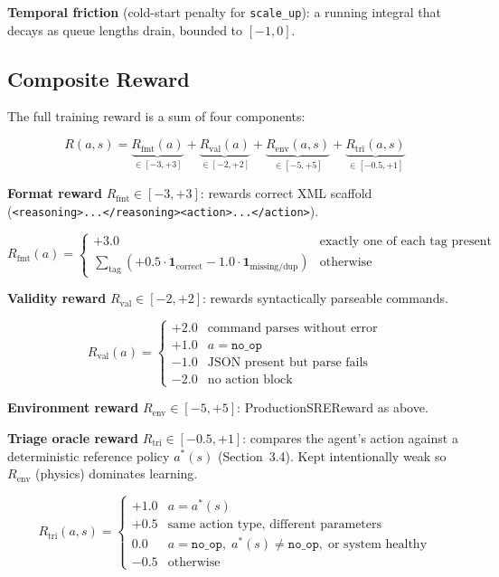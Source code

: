 \documentclass{article}
\begin{document}
\textbf{Temporal friction} (cold-start penalty for \texttt{scale\_up}): a running
integral that decays as queue lengths drain, bounded to $[-1, 0]$.

\subsection{Composite Reward}

The full training reward is a sum of four components:

\[
R(a, s) = \underbrace{R_{\mathrm{fmt}}(a)}_{\in[-3,+3]} + \underbrace{R_{\mathrm{val}}(a)}_{\in[-2,+2]} + \underbrace{R_{\mathrm{env}}(a, s)}_{\in[-5,+5]} + \underbrace{R_{\mathrm{tri}}(a, s)}_{\in[-0.5,+1]}
\]

\textbf{Format reward} $R_{\mathrm{fmt}} \in [-3, +3]$: rewards correct XML scaffold
(\texttt{<reasoning>...</reasoning><action>...</action>}).

\[
R_{\mathrm{fmt}}(a) = \begin{cases}
+3.0 & \text{exactly one of each tag present} \\
\sum_{\text{tag}} (+0.5 \cdot \mathbf{1}_{\text{correct}} - 1.0 \cdot \mathbf{1}_{\text{missing/dup}}) & \text{otherwise}
\end{cases}
\]

\textbf{Validity reward} $R_{\mathrm{val}} \in [-2, +2]$: rewards syntactically
parseable commands.

\[
R_{\mathrm{val}}(a) = \begin{cases}
+2.0 & \text{command parses without error} \\
+1.0 & a = \texttt{no\_op} \\
-1.0 & \text{JSON present but parse fails} \\
-2.0 & \text{no action block}
\end{cases}
\]

\textbf{Environment reward} $R_{\mathrm{env}} \in [-5, +5]$: ProductionSREReward as above.

\textbf{Triage oracle reward} $R_{\mathrm{tri}} \in [-0.5, +1]$: compares the agent's
action against a deterministic reference policy $a^*(s)$ (Section~3.4). Kept
intentionally weak so $R_{\mathrm{env}}$ (physics) dominates learning.

\[
R_{\mathrm{tri}}(a, s) = \begin{cases}
+1.0 & a = a^*(s) \\
+0.5 & \text{same action type, different parameters} \\
0.0  & a = \texttt{no\_op},\; a^*(s) \neq \texttt{no\_op},\; \text{or system healthy} \\
-0.5 & \text{otherwise}
\end{cases}
\]
\end{document}
